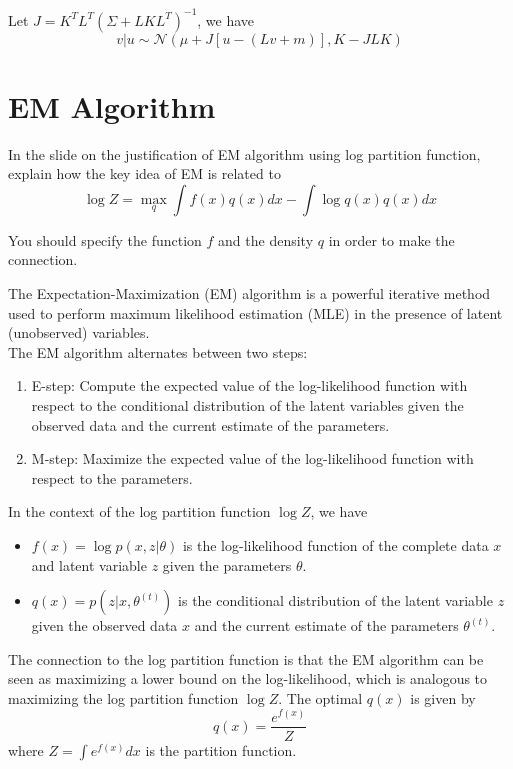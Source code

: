 \documentclass[12pt,a4paper]{article}
\begin{document}
Let $J = K^TL^T(\Sigma + LKL^T)^{-1}$, we have
$$
v|u \sim \mathcal{N}(\mu + J\left[u - (Lv + m)\right], K - JLK)
$$

\newpage
\color{black}

\section{EM Algorithm}

In the slide on the justification of EM algorithm using log partition function, explain how the key idea of EM is related to
$$
\log Z = \underset{q}{\max} \int f(x)q(x)dx - \int \log q(x)q(x)dx
$$

You should specify the function $f$ and the density $q$ in order to make the connection. \\

\color{blue}

The Expectation-Maximization (EM) algorithm is a powerful iterative method used to perform maximum likelihood estimation (MLE) in the presence of latent (unobserved) variables. \\

The EM algorithm alternates between two steps:
\begin{enumerate}
    \item E-step: Compute the expected value of the log-likelihood function with respect to the conditional distribution of the latent variables given the observed data and the current estimate of the parameters.
    \item M-step: Maximize the expected value of the log-likelihood function with respect to the parameters.
\end{enumerate}

In the context of the log partition function $\log Z$, we have
\begin{itemize}
    \item $f(x) = \log p(x, z|\theta)$ is the log-likelihood function of the complete data $x$ and latent variable $z$ given the parameters $\theta$.
    \item $q(x) = p(z|x, \theta^{(t)})$ is the conditional distribution of the latent variable $z$ given the observed data $x$ and the current estimate of the parameters $\theta^{(t)}$.
\end{itemize}

The connection to the log partition function is that the EM algorithm can be seen as maximizing a lower bound on the log-likelihood, which is analogous to maximizing the log partition function $\log Z$.
The optimal $q(x)$ is given by
$$
q(x) = \frac{e^{f(x)}}{Z}
$$
where $Z = \int e^{f(x)}dx$ is the partition function. \\
\end{document}
